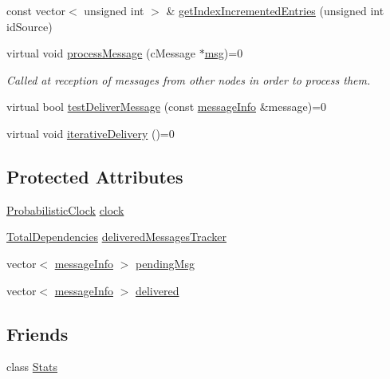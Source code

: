 \begin{DoxyCompactItemize}
const vector$<$ unsigned int $>$ \& \hyperlink{class_node_with_control_acf1daba46cfa16eb2bd7cbd399c2624b}{get\+Index\+Incremented\+Entries} (unsigned int id\+Source)
\item 
virtual void \hyperlink{class_node_with_control_af532082fab76c38d8c50ca90e991f4c3}{process\+Message} (c\+Message $\ast$\hyperlink{_controller_8h_afa0f3b802fbc219228f7bb97996fa558}{msg})=0
\begin{DoxyCompactList}\small\item\em Called at reception of messages from other nodes in order to process them. \end{DoxyCompactList}\item 
virtual bool \hyperlink{class_node_with_control_a84df0beabbaed80e7da017d592480515}{test\+Deliver\+Message} (const \hyperlink{structures_8h_a7e7bdc1d2fff8a9436f2f352b2711ed6}{message\+Info} \&message)=0
\item 
virtual void \hyperlink{class_node_with_control_a4f78078272b90937e0746c797443b37d}{iterative\+Delivery} ()=0
\end{DoxyCompactItemize}
\subsection*{Protected Attributes}
\begin{DoxyCompactItemize}
\item 
\hyperlink{class_probabilistic_clock}{Probabilistic\+Clock} \hyperlink{class_node_with_control_a051a7d7f2452f1f8da3bc5bfb05a7760}{clock}
\item 
\hyperlink{class_total_dependencies}{Total\+Dependencies} \hyperlink{class_node_with_control_a6c868fa52cca68f650dca96a788475df}{delivered\+Messages\+Tracker}
\item 
vector$<$ \hyperlink{structures_8h_a7e7bdc1d2fff8a9436f2f352b2711ed6}{message\+Info} $>$ \hyperlink{class_node_with_control_af38ffbedc82038536c77314f22ea6b57}{pending\+Msg}
\item 
vector$<$ \hyperlink{structures_8h_a7e7bdc1d2fff8a9436f2f352b2711ed6}{message\+Info} $>$ \hyperlink{class_node_with_control_aed34cc5a5b277c43f10f8cbbbeb59327}{delivered}
\end{DoxyCompactItemize}
\subsection*{Friends}
\begin{DoxyCompactItemize}
\item 
class \hyperlink{class_node_with_control_a129f65b6976377739eb6231b6962985e}{Stats}
\end{DoxyCompactItemize}
